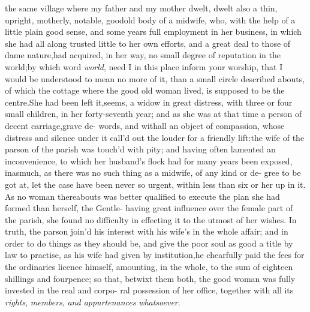 \documentclass{article}
\begin{document}
 the same village where my father
and my mother dwelt, dwelt also a thin, upright, motherly, notable,
good\break old body of a midwife, who, with the help of a little plain
good sense, and some years full employment in her business, in
which she had all along trusted little to her own efforts, and a
great deal to those of dame nature,\tsk had acquired, in her way,
no small degree of reputation in the world;\tsk by which word
\textit{world}, need I in this place inform your worship,
that I would be understood to mean no 
more of it, than a small circle described 
abouts, of which the cottage where the good old woman lived, is supposed to be
the centre.\tsh She had been left it\sic,\break seems, a widow in great distress, with three or
four small children, in her forty-seventh year; and as she was at that time a person
of decent carriage,\tsk grave de-\break
{}
words, and
withall an object of compassion, whose distress and silence under it call’d out the
louder for a friendly lift:\break the wife of the parson of the parish was touch’d with
pity; and having often la\-mented an inconvenience, to which her husband’s flock had
for many years been exposed, inasmuch, as there was no such thing as a midwife, of
any kind or de- gree to be got at, let the case have been never so urgent, within
less than six or 
her up in it. As no woman thereabouts was better
qualified to execute the plan she had formed than
herself, the Gentle-
having great influence over the female part of the
parish, she found no difficulty in effecting it to
the utmost of her wishes. In truth, the parson
join’d his interest 
with his wife’s in the whole affair; and
in order to do things as they should be,\break 
and give the poor soul as good a title by\break
law to practise, as his wife had given by\break
institution,\tsk he chearfully paid the\break
fees for the ordinaries licence himself,\break
amounting, in the whole, to the sum of\break
eighteen shillings and fourpence; so that,\break
betwixt them both, the good woman\break
was fully invested in the real and corpo-\break
ral possession of her office, together with\break
all its \textit{rights}, \textit{members}, \textit{and appurtenances}\break
\textit{whatsoever}.
\end{document}
